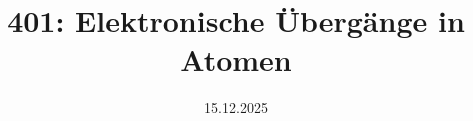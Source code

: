 

\title{401: Elektronische Übergänge in Atomen}

\date{15.12.2025}





\maketitle







\onecolumn

\printbibliography


